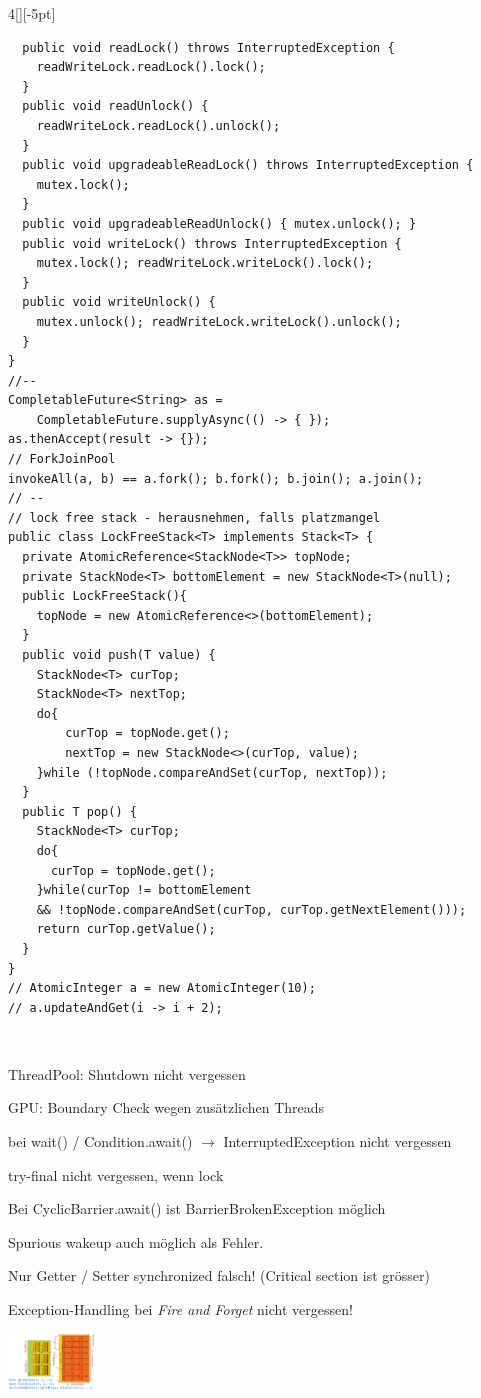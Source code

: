 \documentclass[%
	pdftex,%
	a4paper,%
	landscape,%
	ngerman,
	oneside,%
	6pt,%
	halfparskip,%
]{scrbook}
\newenvironment{mainbox}{%
  \def\FrameCommand{\fboxrule 1px \fcolorbox{black}{spec_blue}}%
  \MakeFramed {\advance\hsize-\width \FrameRestore}}%
 {\endMakeFramed}
\newcommand{\maintopic}[1]{\setcounter{subtopicenum}{0}\setcounter{subsubtopicenum}{0}\vspace{-4px}\begin{mainbox}\textcolor{white}{\textbf{\large{\stepcounter{maintopicenum}\Roman{maintopicenum}. #1}}}\end{mainbox}\vspace{-4px}}
\newenvironment{tight-itemize}
{ \begin{itemize}[leftmargin=*, nosep]
    \setlength{\itemsep}{0px}
    \setlength{\parskip}{0px}
    \setlength{\parsep}{0px}  }
{ \end{itemize}                  }
\begin{document}
\begin{multicols}{4}[][-5pt]
\begin{lstlisting}
  public void readLock() throws InterruptedException {
    readWriteLock.readLock().lock();
  }
  public void readUnlock() {
    readWriteLock.readLock().unlock();
  }
  public void upgradeableReadLock() throws InterruptedException {
    mutex.lock();
  }
  public void upgradeableReadUnlock() { mutex.unlock(); }
  public void writeLock() throws InterruptedException {
    mutex.lock(); readWriteLock.writeLock().lock();
  }
  public void writeUnlock() {
    mutex.unlock(); readWriteLock.writeLock().unlock();
  }
}
//--
CompletableFuture<String> as =
    CompletableFuture.supplyAsync(() -> { });
as.thenAccept(result -> {});
// ForkJoinPool
invokeAll(a, b) == a.fork(); b.fork(); b.join(); a.join();
// --
// lock free stack - herausnehmen, falls platzmangel
public class LockFreeStack<T> implements Stack<T> {
  private AtomicReference<StackNode<T>> topNode;
  private StackNode<T> bottomElement = new StackNode<T>(null);
  public LockFreeStack(){
    topNode = new AtomicReference<>(bottomElement);
  }
  public void push(T value) {
    StackNode<T> curTop;
    StackNode<T> nextTop;
    do{
        curTop = topNode.get();
        nextTop = new StackNode<>(curTop, value);
    }while (!topNode.compareAndSet(curTop, nextTop));
  }
  public T pop() {
    StackNode<T> curTop;
    do{
      curTop = topNode.get();
    }while(curTop != bottomElement
    && !topNode.compareAndSet(curTop, curTop.getNextElement()));
    return curTop.getValue();
  }
}
// AtomicInteger a = new AtomicInteger(10);
// a.updateAndGet(i -> i + 2);
\end{lstlisting}

\maintopic{Checklist}
\begin{tight-itemize}
    \item{ThreadPool: Shutdown nicht vergessen}
    \item{GPU: Boundary Check wegen zusätzlichen Threads}
    \item{bei wait() / Condition.await() $\rightarrow$ InterruptedException nicht vergessen}
    \item{try-final nicht vergessen, wenn lock}
    \item{Bei CyclicBarrier.await() ist BarrierBrokenException möglich}
    \item{Spurious wakeup auch möglich als Fehler.}
    \item{Nur Getter / Setter synchronized falsch! (Critical section ist grösser)}
    \item{Exception-Handling bei \textit{Fire and Forget} nicht vergessen!}
\end{tight-itemize}
\begin{center}
	\includegraphics[width=0.17\textwidth]{img/cuda-grid-and-blocks.png}
\end{center}
\end{multicols}
\end{document}
